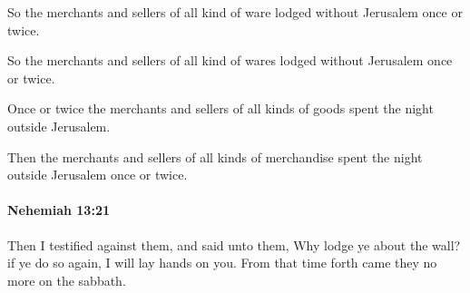 			So the merchants and sellers of all kind of ware lodged without Jerusalem once or twice.

			\begin{versebox}
					\item[BHS] 
					\item[LXX] 
					\item[ASV] So the merchants and sellers of all kind of wares lodged without Jerusalem once or twice.
					\item[NIV] Once or twice the merchants and sellers of all kinds of goods spent the night outside Jerusalem.
					\item[NRSV] Then the merchants and sellers of all kinds of merchandise spent the night outside Jerusalem once or twice.
			\end{versebox}

		\paragraph{Nehemiah 13:21} %
			\label{NEHEMIAH-13-21}

			Then I testified against them, and said unto them, Why lodge ye about the wall? if ye do so again, I will lay hands on you. From that time forth came they no more on the sabbath.

